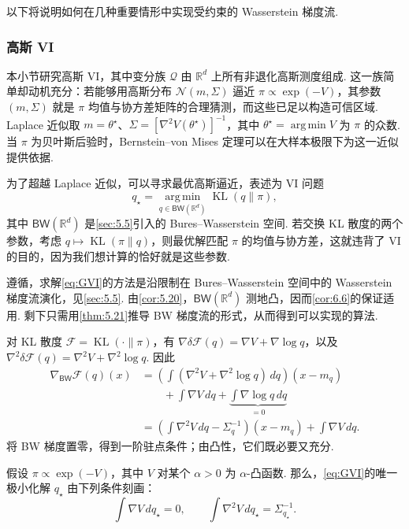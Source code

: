 以下将说明如何在几种重要情形中实现受约束的 Wasserstein 梯度流.

\subsubsection{高斯 VI}\label{sec:6.1.2}

本小节研究高斯 VI，其中变分族 $\mathcal Q$ 由 $\mathbb R^d$ 上所有非退化高斯测度组成. 这一族简单却动机充分：若能够用高斯分布 $\mathcal N(m,\Sigma)$ 逼近 $\pi\propto\exp(-V)$，其参数 $(m,\Sigma)$ 就是 $\pi$ 均值与协方差矩阵的合理猜测，而这些已足以构造可信区域. Laplace 近似取 $m=\theta^\star$、$\Sigma=[\nabla^2V(\theta^\star)]^{-1}$，其中 $\theta^\star=\operatorname{arg\,min}V$ 为 $\pi$ 的众数. 当 $\pi$ 为贝叶斯后验时，Bernstein--von Mises 定理可以在大样本极限下为这一近似提供依据.

为了超越 Laplace 近似，可以寻求最优高斯逼近，表述为 VI 问题
\begin{equation}\tag{GVI}\label{eq:GVI}
q_\star=\operatorname*{arg\,min}_{q\in\mathsf{BW}(\mathbb R^d)}\operatorname{KL}(q\|\pi),
\end{equation}
其中 $\mathsf{BW}(\mathbb R^d)$ 是\autoref{sec:5.5}引入的 Bures--Wasserstein 空间. 若交换 KL 散度的两个参数，考虑 $q\mapsto\operatorname{KL}(\pi\|q)$，则最优解匹配 $\pi$ 的均值与协方差，这就违背了 VI 的目的，因为我们想计算的恰好就是这些参数.

遵循\cite{ref192}，求解\eqref{eq:GVI}的方法是沿限制在 Bures--Wasserstein 空间中的 Wasserstein 梯度流演化，见\autoref{sec:5.5}. 由\autoref{cor:5.20}，$\mathsf{BW}(\mathbb R^d)$ 测地凸，因而\autoref{cor:6.6}的保证适用. 剩下只需用\autoref{thm:5.21}推导 BW 梯度流的形式，从而得到可以实现的算法.

对 KL 散度 $\mathcal F=\operatorname{KL}(\cdot\|\pi)$，有 $\nabla\delta\mathcal F(q)=\nabla V+\nabla\log q$，以及 $\nabla^2\delta\mathcal F(q)=\nabla^2V+\nabla^2\log q$. 因此
$$
\begin{aligned}
\nabla_{\mathsf{BW}}\mathcal F(q)(x)
&=\left(\int(\nabla^2V+\nabla^2\log q)\,dq\right)(x-m_q)\\
&\qquad+\int\nabla V\,dq+\underbrace{\int\nabla\log q\,dq}_{=0}\\
&=\left(\int\nabla^2V\,dq-\Sigma_q^{-1}\right)(x-m_q)+\int\nabla V\,dq.
\end{aligned}
$$
将 BW 梯度置零，得到一阶驻点条件；由凸性，它们既必要又充分.

\begin{proposition}\label{prop:6.7}
假设 $\pi\propto\exp(-V)$，其中 $V$ 对某个 $\alpha>0$ 为 $\alpha$-凸函数. 那么，\eqref{eq:GVI}的唯一极小化解 $q_\star$ 由下列条件刻画：
$$
\int\nabla V\,dq_\star=0,
\qquad\int\nabla^2V\,dq_\star=\Sigma_{q_\star}^{-1}.
$$
\end{proposition}

